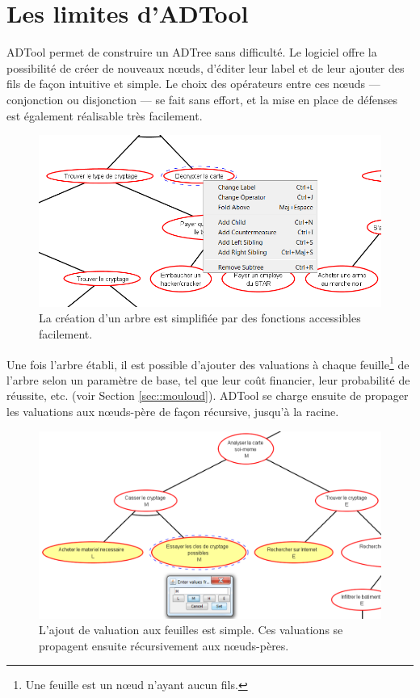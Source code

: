 \section{Les limites d'ADTool}
	\label{sec:adtool}

	ADTool permet de construire un ADTree sans difficulté. Le logiciel offre la possibilité de créer de nouveaux nœuds, d'éditer leur label et de leur ajouter des fils de façon intuitive et simple. Le choix des opérateurs entre ces nœuds --- conjonction ou disjonction ---  se fait sans effort, et la mise en place de défenses est également réalisable très facilement. 
	
	\begin{figure}[h]
            \centering
            \includegraphics[width=1\textwidth]{figure/adtool_add_child.png}
            \caption{La création d'un arbre est simplifiée par des fonctions accessibles facilement.}
            \label{fig:arbre_exemple_1}
    \end{figure}
	
	
	Une fois l'arbre établi, il est possible d'ajouter des valuations à chaque feuille\footnote{Une feuille est un nœud n'ayant aucun fils.} de l'arbre selon un paramètre de base, tel que leur coût financier, leur probabilité de réussite, etc. (voir Section \ref{sec::mouloud}). ADTool se charge ensuite de propager les valuations aux nœuds-père de façon récursive, jusqu'à la racine.
	
	\begin{figure}[h]
            \centering
            \includegraphics[width=1\textwidth]{figure/adtool_add_values.png}
            \caption{L'ajout de valuation aux feuilles est simple. Ces valuations se propagent ensuite récursivement aux nœuds-pères.}
            \label{fig:arbre_exemple_1}
    \end{figure}
	
